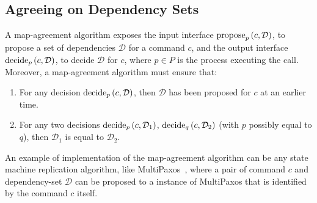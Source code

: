 \subsection{Agreeing on Dependency Sets}
\label{map-algo}

A map-agreement algorithm exposes the input interface $\operatorname{propose}_p\left( c, \mathcal{D} \right)$, to propose a set of dependencies $\mathcal{D}$ for a command $c$, and the output interface $\operatorname{decide}_p\left( c, \mathcal{D} \right)$, to decide $\mathcal{D}$ for $c$, where $p\in P$ is the process executing the call.
Moreover, a map-agreement algorithm must ensure that: 
\begin{comment}
\begin{enumerate}[noitemsep,nolistsep]
    \item If the set of dependencies $\mathcal{D}$ is decided for a command $c$, then $\mathcal{D}$ has been proposed for $c$ at an earlier time.
    \item If $\mathcal{D}_1$ is decided for a command $c$ and $\mathcal{D}_2$ is decided for the same command $c$, then $\mathcal{D}_1$ is equal to $\mathcal{D}_2$.
 \end{enumerate}

\todo{OR MORE FORMALLY}

\end{comment}

\begin{enumerate}
    \item For any decision $\operatorname{decide}_p\left( c, \mathcal{D} \right)$, then $\mathcal{D}$ has been proposed for $c$ at an earlier time.
    \item For any two decisions $\operatorname{decide}_p\left( c, \mathcal{D}_1 \right)$, $\operatorname{decide}_q\left( c, \mathcal{D}_2 \right)$ (with $p$ possibly equal to $q$), then $\mathcal{D}_1$ is equal to $\mathcal{D}_2$.


\end{enumerate}

An example of implementation of the map-agreement algorithm can be any state machine replication algorithm, like MultiPaxos~\cite{lamport2001paxos}, where a pair of command $c$ and dependency-set $\mathcal{D}$ can be proposed to a instance of MultiPaxos that is identified by the command $c$ itself.





